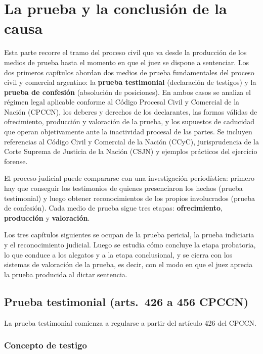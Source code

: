 \documentclass[12pt,oneside]{book}
\begin{document}
\part{La prueba y la conclusión de la causa}
Esta parte recorre el tramo del proceso civil que va desde la producción de los medios de prueba hasta el momento en que el juez se dispone a sentenciar. Los dos primeros capítulos abordan dos medios de prueba fundamentales del proceso civil y comercial argentino: la \textbf{prueba testimonial} (declaración de testigos) y la \textbf{prueba de confesión} (absolución de posiciones). En ambos casos se analiza el régimen legal aplicable conforme al Código Procesal Civil y Comercial de la Nación (CPCCN), los deberes y derechos de los declarantes, las formas válidas de ofrecimiento, producción y valoración de la prueba, y los supuestos de caducidad que operan objetivamente ante la inactividad procesal de las partes. Se incluyen referencias al Código Civil y Comercial de la Nación (CCyC), jurisprudencia de la Corte Suprema de Justicia de la Nación (CSJN) y ejemplos prácticos del ejercicio forense.

El proceso judicial puede compararse con una investigación periodística: primero hay que conseguir los testimonios de quienes presenciaron los hechos (prueba testimonial) y luego obtener reconocimientos de los propios involucrados (prueba de confesión). Cada medio de prueba sigue tres etapas: \textbf{ofrecimiento}, \textbf{producción} y \textbf{valoración}.

Los tres capítulos siguientes se ocupan de la prueba pericial, la prueba indiciaria y el reconocimiento judicial. Luego se estudia cómo concluye la etapa probatoria, lo que conduce a los alegatos y a la etapa conclusional, y se cierra con los sistemas de valoración de la prueba, es decir, con el modo en que el juez aprecia la prueba producida al dictar sentencia.

\chapter[Prueba testimonial]{Prueba testimonial (arts.~426 a 456 CPCCN)}\label{cap:testimonial}


La prueba testimonial comienza a regularse a partir del artículo 426 del CPCCN.

\section{Concepto de testigo}
\end{document}
